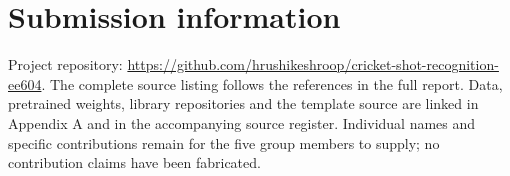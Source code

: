 \section*{Submission information}
Project repository: \url{https://github.com/hrushikeshroop/cricket-shot-recognition-ee604}.
The complete source listing follows the references in the full report. Data, pretrained weights, library repositories and the template source are linked in Appendix A and in the accompanying source register. Individual names and specific contributions remain for the five group members to supply; no contribution claims have been fabricated.
